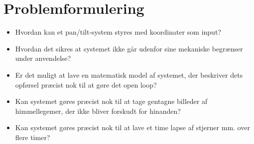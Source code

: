 \section{Problemformulering}

\begin{itemize}
	\item	Hvordan kan et pan/tilt-system styres med koordinater som input?
	\item	Hvordan det sikres at systemet ikke går udenfor sine mekaniske begrænser under anvendelse?
	\item 	Er det muligt at lave en matematisk model af systemet, der beskriver dets opførsel præcist nok til at gøre det open loop?
	\item   Kan systemet gøres præcist nok til at tage gentagne billeder af himmellegemer, der ikke bliver forskudt for hinanden?
	\item 	Kan systemet gøres præcist nok til at lave et time lapse af stjerner mm. over flere timer?
\end{itemize}
